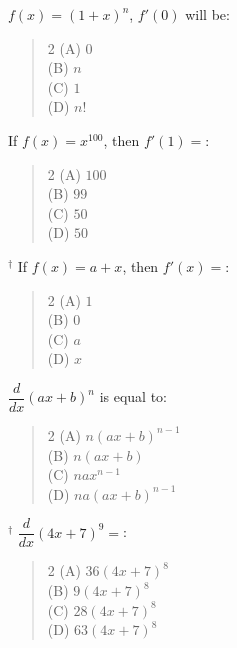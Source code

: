 \documentclass[11pt,a4paper]{article}
\begin{document}
\begin{mcqlist}
\item $f(x)=(1+x)^n$, $f'(0)$ will be:
\begin{quote}\begin{multicols}{2}
\noindent (A) $0$ \\
(B) $n$ \\
(C) $1$ \\
(D) $n!$
\end{multicols}\end{quote}

\item If $f(x)=x^{100}$, then $f'(1)=$:
\begin{quote}\begin{multicols}{2}
\noindent (A) $100$ \\
(B) $99$ \\
(C) $50$ \\
(D) $50$
\end{multicols}\end{quote}

\item $^{\dagger}$ If $f(x)=a+x$, then $f'(x)=$:
\begin{quote}\begin{multicols}{2}
\noindent (A) $1$ \\
(B) $0$ \\
(C) $a$ \\
(D) $x$
\end{multicols}\end{quote}

\item $\dfrac{d}{dx}(ax+b)^n$ is equal to:
\begin{quote}\begin{multicols}{2}
\noindent (A) $n(ax+b)^{n-1}$ \\
(B) $n(ax+b)$ \\
(C) $nax^{n-1}$ \\
(D) $na(ax+b)^{n-1}$
\end{multicols}\end{quote}

\item $^{\dagger}$ $\dfrac{d}{dx}(4x+7)^9 = $:
\begin{quote}\begin{multicols}{2}
\noindent (A) $36(4x+7)^8$ \\
(B) $9(4x+7)^8$ \\
(C) $28(4x+7)^8$ \\
(D) $63(4x+7)^8$
\end{multicols}\end{quote}


\end{mcqlist}
\end{document}
